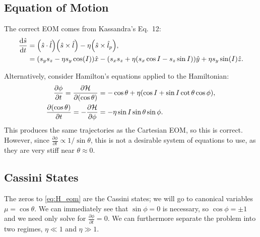 \documentclass[11pt,
        usenames, %
        dvipsnames %
    ]{article}
\newcommand*{\rd}[2]{\frac{\mathrm{d}#1}{\mathrm{d}#2}}
\newcommand*{\pd}[2]{\frac{\partial#1}{\partial#2}}
\DeclarePairedDelimiter\p{\lparen}{\rparen}
\begin{document}
\subsection{Equation of Motion}

The correct EOM comes from Kassandra's Eq.\ 12:
\begin{align*}
    \rd{\hat{s}}{t} &=
        \p*{\hat{s} \cdot \hat{l}}\p*{\hat{s} \times \hat{l}}
            -\eta\p*{\hat{s} \times \hat{l}_p},\\
        &= \p*{s_ys_z - \eta s_y\cos(I)}\hat{x}
            - \p*{s_xs_z + \eta \p*{s_x\cos I - s_z\sin I}}\hat{y}
            + \eta s_y \sin(I)\hat{z}.
\end{align*}

Alternatively, consider Hamilton's equations applied to the Hamiltonian:
\begin{align}
    \pd{\phi}{t} = \pd{\mathcal{H}}{(\cos\theta)}
        &= -\cos\theta + \eta\p*{\cos I + \sin I \cot \theta \cos \phi},\\
    \pd{(\cos \theta)}{t} = -\pd{\mathcal{H}}{\phi}
        &= -\eta \sin I \sin \theta \sin \phi.\label{eq:H_eom}
\end{align}
This produces the same trajectories as the Cartesian EOM, so this is correct.
However, since $\pd{\phi}{t} \propto 1/\sin\theta$, this is not a desirable
system of equations to use, as they are very stiff near $\theta \approx 0$.

\subsection{Cassini States}

The zeros to \autoref{eq:H_eom} are the Cassini states; we will go to canonical
variables $\mu = \cos\theta$. We can immediately see that $\sin\phi = 0$ is
necessary, so $\cos \phi = \pm 1$ and we need only solve for $\pd{\phi}{t} = 0$.
We can furthermore separate the problem into two regimes, $\eta \ll 1$ and $\eta
\gg 1$.
\end{document}
